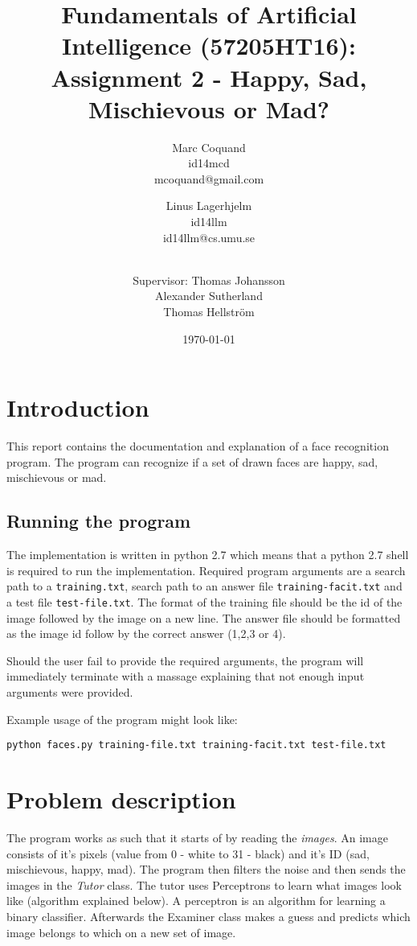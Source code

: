 \documentclass[12pt]{article}
\title{Fundamentals of Artificial Intelligence (57205HT16): Assignment 2 -
Happy, Sad, Mischievous or Mad?}
\author{
    Marc Coquand \\ 
    id14mcd \\
    mcoquand@gmail.com \and
		Linus Lagerhjelm \\
		id14llm \\
		id14llm@cs.umu.se \and \\
		Supervisor: Thomas Johansson\\
		Alexander Sutherland \\
		Thomas Hellström
}
\date{\today}
\begin{document}
\maketitle

\newpage
\tableofcontents

\newpage
\section{Introduction}

This report contains the documentation and explanation of a face recognition
program. The program can recognize if a set of drawn faces are happy, sad,
mischievous or mad.


\subsection{Running the program}

The implementation is written in python 2.7 which means that a python 2.7 shell
is required to run the implementation. Required program arguments are a search
path to a \texttt{training.txt}, search path to an answer file
\texttt{training-facit.txt} and a test file \texttt{test-file.txt}. The format
of the training file should be the id of the image followed by the image on a
new line. The answer file should be formatted as the image id follow by the
correct answer (1,2,3 or 4).

Should the user fail to provide the required arguments, the program will
immediately terminate with a massage explaining that not enough input
arguments were provided.

Example usage of the program might look like:
\begin{verbatim}
python faces.py training-file.txt training-facit.txt test-file.txt
\end{verbatim}






\section {Problem description}

The program works as such that it starts of by reading the \textit{images}. An
image consists of it's pixels (value from 0 - white to 31 - black) and it's ID
(sad, mischievous, happy, mad). The program then filters the noise and then
sends the images in the \textit{Tutor} class. The tutor uses Perceptrons to
learn what images look like (algorithm explained below). A perceptron is an
algorithm for learning a binary classifier. Afterwards the Examiner class makes
a guess and predicts which image belongs to which on a new set of image.
\end{document}
